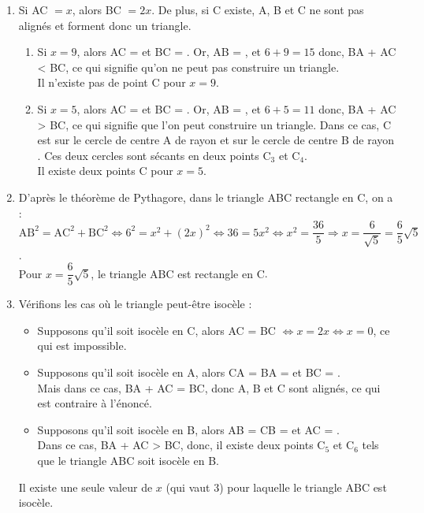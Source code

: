 \begin{corrige}
\begin{enumerate}
\begin{enumerate}
         \end{enumerate} 
      \setcounter{enumi}{1}
      \item Si AC $=x$, alors BC $=2x$. De plus, si C existe, A, B et C ne sont pas alignés et forment donc un triangle.
         \begin{enumerate}
            \item Si $x=9$, alors AC =  et BC = . Or, AB = , et $6+9 =15$ donc, BA + AC < BC, ce qui signifie qu'on ne peut pas construire un triangle. \\
            {\blue Il n'existe pas de point C pour $x=9$}.
            \item Si $x=5$, alors AC =  et BC = . Or, AB = , et $6+5 =11$ donc, BA + AC > BC, ce qui signifie que l'on peut construire un triangle. Dans ce cas, C est sur le cercle de centre A de rayon  et sur le cercle de centre B de rayon . Ces deux cercles sont sécants en deux points C$_3$ et C$_4$. \\
            {\blue Il existe deux points C pour $x=5$}.
         \end{enumerate}
      \setcounter{enumi}{2}
      \item D'après le théorème de Pythagore, dans le triangle ABC rectangle en C, on a : \\
         $\text{AB}^2 =\text{AC}^2+\text{BC}^2 \iff 6^2 =x^2+(2x)^2 \iff 36 =5x^2 \iff x^2 =\dfrac{36}{5} \Longrightarrow x=\dfrac{6}{\sqrt5} =\dfrac{6}{5}\sqrt5$. \\
         {\blue Pour $x=\dfrac65\sqrt5$, le triangle ABC est rectangle en C}. \smallskip
       \item Vérifions les cas où le triangle peut-être isocèle :
          \begin{itemize}
            \item Supposons qu'il soit isocèle en C, alors AC = BC $\iff x =2x \iff x=0$, ce qui est impossible.
            \item Supposons qu'il soit isocèle en A, alors CA = BA =  et BC = . \\
               Mais dans ce cas, BA + AC = BC, donc A, B et C sont alignés, ce qui est contraire à l'énoncé.
             \item Supposons qu'il soit isocèle en B, alors AB = CB =  et AC = . \\
               Dans ce cas, BA + AC > BC, donc, il existe deux points C$_5$ et C$_6$ tels que le triangle ABC soit isocèle en B.             
          \end{itemize}
         {\blue Il existe une seule valeur de $x$ (qui vaut 3) pour laquelle le triangle ABC est isocèle}.
   \end{enumerate}
\end{corrige}

